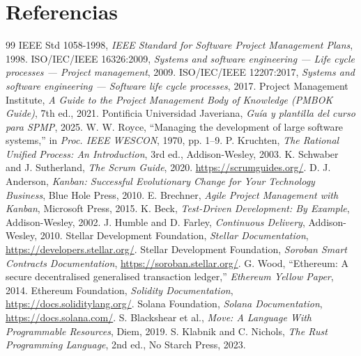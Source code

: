 \documentclass[12pt,oneside]{report}
\begin{document}
  \section*{Referencias}
  \label{sec:referencias}
    \begin{thebibliography}{99}
       IEEE Std 1058-1998, \textit{IEEE Standard for Software Project Management Plans}, 1998.
       ISO/IEC/IEEE 16326:2009, \textit{Systems and software engineering — Life cycle processes — Project management}, 2009.
       ISO/IEC/IEEE 12207:2017, \textit{Systems and software engineering — Software life cycle processes}, 2017.
       Project Management Institute, \textit{A Guide to the Project Management Body of Knowledge (PMBOK Guide)}, 7th ed., 2021.
       Pontificia Universidad Javeriana, \textit{Guía y plantilla del curso para SPMP}, 2025.
       W. W. Royce, ``Managing the development of large software systems,'' in \textit{Proc. IEEE WESCON}, 1970, pp. 1--9.
       P. Kruchten, \textit{The Rational Unified Process: An Introduction}, 3rd ed., Addison-Wesley, 2003.
       K. Schwaber and J. Sutherland, \textit{The Scrum Guide}, 2020. \url{https://scrumguides.org/}.
       D. J. Anderson, \textit{Kanban: Successful Evolutionary Change for Your Technology Business}, Blue Hole Press, 2010.
       E. Brechner, \textit{Agile Project Management with Kanban}, Microsoft Press, 2015.
       K. Beck, \textit{Test-Driven Development: By Example}, Addison-Wesley, 2002.
       J. Humble and D. Farley, \textit{Continuous Delivery}, Addison-Wesley, 2010.
       Stellar Development Foundation, \textit{Stellar Documentation}, \url{https://developers.stellar.org/}.
       Stellar Development Foundation, \textit{Soroban Smart Contracts Documentation}, \url{https://soroban.stellar.org/}.
       G. Wood, ``Ethereum: A secure decentralised generalised transaction ledger,'' \textit{Ethereum Yellow Paper}, 2014.
       Ethereum Foundation, \textit{Solidity Documentation}, \url{https://docs.soliditylang.org/}.
       Solana Foundation, \textit{Solana Documentation}, \url{https://docs.solana.com/}.
       S. Blackshear et al., \textit{Move: A Language With Programmable Resources}, Diem, 2019.
       S. Klabnik and C. Nichols, \textit{The Rust Programming Language}, 2nd ed., No Starch Press, 2023.

\end{thebibliography}
\end{document}
